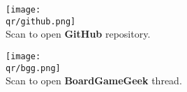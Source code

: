 \bigbreak

\begin{multicols}{2}
\centering
\texttt{[image: \\qr/github.png]}\\
Scan to open \textbf{GitHub} repository.

\columnbreak

\texttt{[image: \\qr/bgg.png]}\\
Scan to open \textbf{BoardGameGeek} thread.
\end{multicols}

